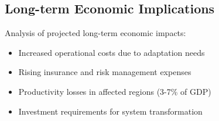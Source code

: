 \subsection{Long-term Economic Implications}
Analysis of projected long-term economic impacts:
\begin{itemize}
    \item Increased operational costs due to adaptation needs
    \item Rising insurance and risk management expenses
    \item Productivity losses in affected regions (3-7\% of GDP)
    \item Investment requirements for system transformation
\end{itemize}
